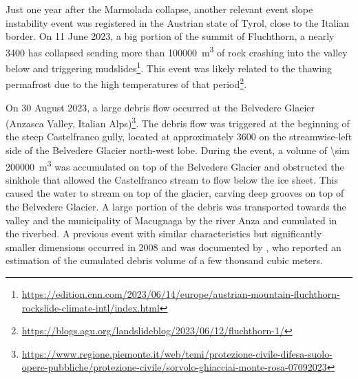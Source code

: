 Just one year after the Marmolada collapse, another relevant event slope instability event was registered in the Austrian state of Tyrol, close to the Italian border. 
On 11 June 2023, a big portion of the summit of Fluchthorn, a nearly \SI{3400}{\masl} has collapsed sending more than \SI{100000}{\cubic\meter} of rock crashing into the valley below and triggering mudslides\footnote{\mbox{\url{https://edition.cnn.com/2023/06/14/europe/austrian-mountain-fluchthorn-rockslide-climate-intl/index.html}}}.
This event was likely related to the thawing permafrost due to the high temperatures of that period\footnote{\url{https://blogs.agu.org/landslideblog/2023/06/12/fluchthorn-1/}}.

On 30 August 2023, a large debris flow occurred at the Belvedere Glacier
(Anzasca Valley, Italian Alps)\footnote{\url{https://www.regione.piemonte.it/web/temi/protezione-civile-difesa-suolo-opere-pubbliche/protezione-civile/sorvolo-ghiacciai-monte-rosa-07092023}}.
The debris flow was triggered at the beginning of the steep Castelfranco gully, located at approximately \SI{3600}{\masl} on the streamwise-left side of the Belvedere Glacier north-west lobe.
During the event, a volume of \SI{\sim 200000}{\cubic\meter} was accumulated on top of the Belvedere Glacier and obstructed the sinkhole that allowed the Castelfranco stream to flow below the ice sheet. 
This caused the water to stream on top of the glacier, carving deep grooves on top of the Belvedere Glacier. 
A large portion of the debris was transported towards the valley and the municipality of Macugnaga by the river Anza and cumulated in the riverbed.
A previous event with similar characteristics but significantly smaller dimensions occurred in 2008 and was documented by \cite{Mortara2009_ghiacciaoBelvedere}, who reported an estimation of the cumulated debris volume of a few thousand cubic meters.

